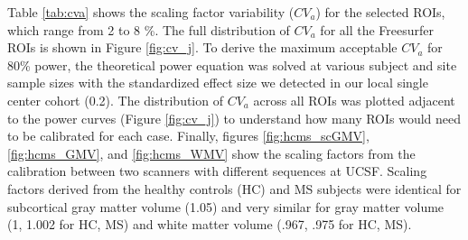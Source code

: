 Table \ref{tab:cva} shows the scaling factor variability ($CV_{a}$) for the selected ROIs, which range from 2 to 8 \%. The full distribution of $CV_{a}$ for all the Freesurfer ROIs is shown in Figure \ref{fig:cv_j}. To derive the maximum acceptable $CV_{a}$ for 80\% power, the theoretical power equation was solved at various subject and site sample sizes with the standardized effect size we detected in our local single center cohort (0.2). The distribution of $CV_{a}$ across all ROIs was plotted adjacent to the power curves (Figure \ref{fig:cv_j}) to understand how many ROIs would need to be calibrated for each case. Finally, figures \ref{fig:hcms_scGMV}, \ref{fig:hcms_GMV}, and \ref{fig:hcms_WMV} show the scaling factors from the calibration between two scanners with different sequences at UCSF. Scaling factors derived from the healthy controls (HC) and MS subjects were identical for subcortical gray matter volume (1.05) and very similar for gray matter volume (1, 1.002 for HC, MS) and white matter volume (.967, .975 for HC, MS).